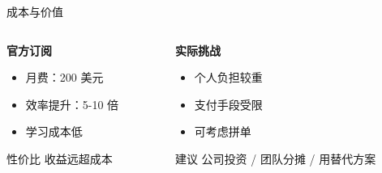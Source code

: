 \documentclass[aspectratio=169,xcolor=dvipsnames]{beamer}
\begin{document}
\begin{frame}{成本与价值}
  \begin{columns}
    \begin{column}{0.48\textwidth}
      \textbf{官方订阅}
      \begin{itemize}
        \item 月费：200 美元
        \item 效率提升：5-10 倍
        \item 学习成本低
      \end{itemize}

      \vspace{0.3cm}

      \begin{alertblock}{性价比}
        收益远超成本
      \end{alertblock}
    \end{column}
    \begin{column}{0.48\textwidth}
      \textbf{实际挑战}
      \begin{itemize}
        \item 个人负担较重
        \item 支付手段受限
        \item 可考虑拼单
      \end{itemize}

      \vspace{0.3cm}

      \begin{exampleblock}{建议}
        公司投资 / 团队分摊 / 用替代方案
      \end{exampleblock}
    \end{column}
  \end{columns}
\end{frame}
\end{document}
